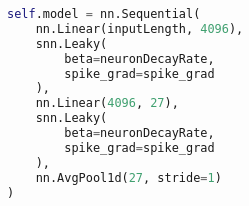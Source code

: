 \begin{lstlisting}[language=Python, caption={SNN architecture}]
self.model = nn.Sequential(
	nn.Linear(inputLength, 4096),
	snn.Leaky(
		beta=neuronDecayRate, 
		spike_grad=spike_grad
	),
	nn.Linear(4096, 27),
	snn.Leaky(
		beta=neuronDecayRate, 
		spike_grad=spike_grad
	),
	nn.AvgPool1d(27, stride=1)
)
\end{lstlisting}